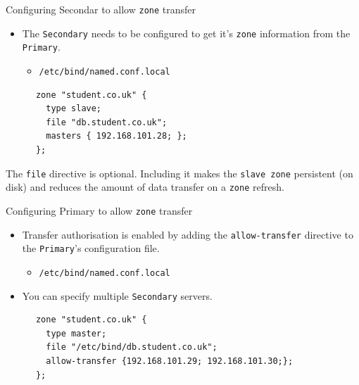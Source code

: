 \documentclass[xcolor=table]{beamer}
\begin{document}
\begin{frame}[fragile]{Configuring Secondar to allow \texttt{zone} transfer}
  \begin{itemize}
    \item The \texttt{Secondary} needs to be configured to get it's \texttt{zone} information from the \texttt{Primary}.
      \begin{itemize}
        \item \texttt{/etc/bind/named.conf.local}
      \end{itemize}
  \end{itemize}
  \begin{tcolorbox}
    \lstset{
      basicstyle=\tiny\ttfamily,
    }
    \begin{lstlisting}
      zone "student.co.uk" {
        type slave;
        file "db.student.co.uk";
        masters { 192.168.101.28; };
      };    
    \end{lstlisting}
  \end{tcolorbox}
  \begin{tcolorbox}[title={\textbf{NOTE:}}]
    \begin{center}
      \scriptsize The \texttt{file} directive is optional. Including it makes the \texttt{slave zone} persistent (on disk) and reduces the amount of data 
      transfer on a \texttt{zone} refresh.
    \end{center}
  \end{tcolorbox}
\end{frame}

\begin{frame}[fragile]{Configuring Primary to allow \texttt{zone} transfer}
  \begin{itemize}
    \item Transfer authorisation is enabled by adding the \texttt{allow-transfer} directive to the \texttt{Primary}'s configuration file.
      \begin{itemize}
        \item \texttt{/etc/bind/named.conf.local}
      \end{itemize}
    \item You can specify multiple \texttt{Secondary} servers.
  \end{itemize}
  \begin{tcolorbox}
    \lstset{
      basicstyle=\tiny\ttfamily,
    }
    \begin{lstlisting}
      zone "student.co.uk" {
        type master;
        file "/etc/bind/db.student.co.uk";
        allow-transfer {192.168.101.29; 192.168.101.30;};
      };          
    \end{lstlisting}
  \end{tcolorbox}
\end{frame}
\end{document}
